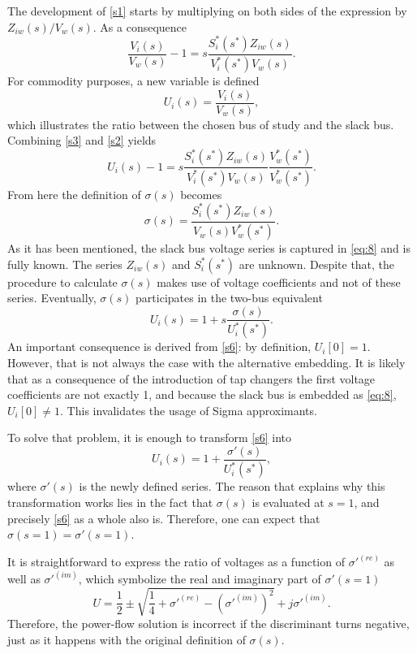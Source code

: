 \documentclass[conference]{IEEEtran}
\begin{document}
The development of \eqref{s1} starts by multiplying on both sides of the expression by $Z_{iw}(s)/V_w(s)$. As a consequence
\begin{equation}
  \frac{V_i(s)}{V_w(s)}-1=s\frac{S^*_i(s^*)Z_{iw}(s)}{V^*_i(s^*)V_w(s)}.
  \label{s2}
\end{equation}
For commodity purposes, a new variable is defined
\begin{equation}
  U_i(s)=\frac{V_i(s)}{V_w(s)},
  \label{s3}
\end{equation}
which illustrates the ratio between the chosen bus of study and the slack bus. Combining \eqref{s3} and \eqref{s2} yields
\begin{equation}
  U_i(s)-1=s\frac{S^*_i(s^*)Z_{iw}(s)}{V^*_i(s^*)V_w(s)}\frac{V^*_w(s^*)}{V^*_w(s^*)}.
  \label{s4}
\end{equation}
From here the definition of $\sigma(s)$ becomes
\begin{equation}
  \sigma(s)=\frac{S^*_i(s^*)Z_{iw}(s)}{V_w(s)V^*_w(s^*)}.
  \label{s5}
\end{equation}
As it has been mentioned, the slack bus voltage series is captured in \eqref{eq:8} and is fully known. The series $Z_{iw}(s)$ and $S^*_i(s^*)$ are unknown. Despite that, the procedure to calculate $\sigma(s)$ makes use of voltage coefficients and not of these series. Eventually, $\sigma(s)$ participates in the two-bus equivalent
\begin{equation}
  U_i(s)=1+s\frac{\sigma(s)}{U^*_i(s^*)}.
  \label{s6}
\end{equation}
An important consequence is derived from \eqref{s6}: by definition, $U_i[0]=1$. However, that is not always the case with the alternative embedding. It is likely that as a consequence of the introduction of tap changers the first voltage coefficients are not exactly 1, and because the slack bus is embedded as \eqref{eq:8}, $U_i[0]\neq 1$. This invalidates the usage of Sigma approximants. 

To solve that problem, it is enough to transform \eqref{s6} into
\begin{equation}
  U_i(s)=1+\frac{\sigma '(s)}{U^*_i(s^*)},
  \label{s7}
\end{equation}
where $\sigma '(s)$ is the newly defined series. The reason that explains why this transformation works lies in the fact that $\sigma(s)$ is evaluated at $s=1$, and precisely \eqref{s6} as a whole also is. Therefore, one can expect that $\sigma(s=1)=\sigma '(s=1)$.

It is straightforward to express the ratio of voltages as a function of $\sigma '^{(re)}$ as well as $\sigma'^{(im)}$, which symbolize the real and imaginary part of $\sigma '(s=1)$
\begin{equation}
  U=\frac{1}{2}\pm \sqrt{\frac{1}{4} +\sigma'^{(re)} - (\sigma'^{(im)})^2} +j\sigma '^{(im)} .
  \label{s8}
\end{equation} 
Therefore, the power-flow solution is incorrect if the discriminant turns negative, just as it happens with the original definition of $\sigma(s)$.
\end{document}
